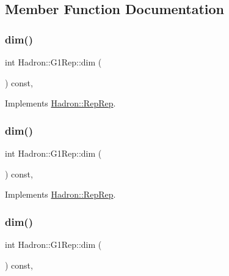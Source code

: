 \subsection{Member Function Documentation}
\mbox{\label{structHadron_1_1G1Rep_ab5e3b558f74546bd0c29b5a913aca993}} 
\subsubsection{\texorpdfstring{dim()}{dim()}\hspace{0.1cm}{\footnotesize\ttfamily [1/5]}}
{\footnotesize\ttfamily int Hadron\+::\+G1\+Rep\+::dim (\begin{DoxyParamCaption}{ }\end{DoxyParamCaption}) const\hspace{0.3cm}{\ttfamily [inline]}, {\ttfamily [virtual]}}



Implements \mbox{\hyperlink{structHadron_1_1RepRep_a92c8802e5ed7afd7da43ccfd5b7cd92b}{Hadron\+::\+Rep\+Rep}}.

\mbox{\label{structHadron_1_1G1Rep_ab5e3b558f74546bd0c29b5a913aca993}} 
\subsubsection{\texorpdfstring{dim()}{dim()}\hspace{0.1cm}{\footnotesize\ttfamily [2/5]}}
{\footnotesize\ttfamily int Hadron\+::\+G1\+Rep\+::dim (\begin{DoxyParamCaption}{ }\end{DoxyParamCaption}) const\hspace{0.3cm}{\ttfamily [inline]}, {\ttfamily [virtual]}}



Implements \mbox{\hyperlink{structHadron_1_1RepRep_a92c8802e5ed7afd7da43ccfd5b7cd92b}{Hadron\+::\+Rep\+Rep}}.

\mbox{\label{structHadron_1_1G1Rep_ab5e3b558f74546bd0c29b5a913aca993}} 
\subsubsection{\texorpdfstring{dim()}{dim()}\hspace{0.1cm}{\footnotesize\ttfamily [3/5]}}
{\footnotesize\ttfamily int Hadron\+::\+G1\+Rep\+::dim (\begin{DoxyParamCaption}{ }\end{DoxyParamCaption}) const\hspace{0.3cm}{\ttfamily [inline]}, {\ttfamily [virtual]}}



